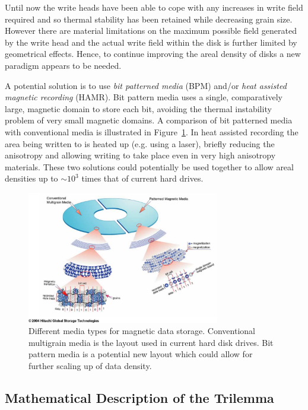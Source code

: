 Until now the write heads have been able to cope with any increases in write field required and so thermal stability has been retained while decreasing grain size.\cite{McDaniel2005} However there are material limitations on the maximum possible field generated by the write head\cite{Richter2007a} and the actual write field within the disk is further limited by geometrical effects. Hence, to continue improving the areal density of disks a new paradigm appears to be needed.

A potential solution is to use \emph{bit patterned media} \cite{Terris2006} (BPM) and/or \emph{heat assisted magnetic recording}\cite{Kryder2008} (HAMR). Bit pattern media uses a single, comparatively large, magnetic domain to store each bit, avoiding the thermal instability problem of very small magnetic domains. A comparison of bit patterned media with conventional media is illustrated in Figure~\ref{fig:Layouts-for-magnetic}. In heat assisted recording the area being written to is heated up (e.g. using a laser), briefly reducing the anisotropy and allowing writing to take place even in very high anisotropy materials. These two solutions could potentially be used together to allow areal densities up to $\sim10^{3}$ times that of current hard drives.\cite{McDaniel2005}

\begin{figure}[!ht]
  \center
  \includegraphics[width=0.75\textwidth]{./images/conventional_vs_pattern_media}
  \caption{Different media types for magnetic data storage. Conventional multigrain media is
    the layout used in current hard disk drives. Bit pattern media is a potential new layout which could allow for further scaling up of data density.
    \cite{conventional_vs_patterned_media} \label{fig:Layouts-for-magnetic}}
\end{figure}

\subsection{Mathematical Description of the Trilemma}

